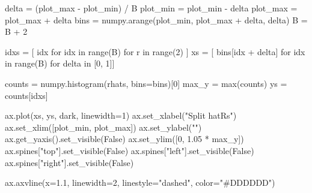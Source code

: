 \documentclass[
  letterpaper,
  DIV=11,
  numbers=noendperiod]{scrartcl}
\newenvironment{Shaded}{\begin{snugshade}}{\end{snugshade}}
\newcommand{\BuiltInTok}[1]{\textcolor[rgb]{0.00,0.23,0.31}{#1}}
\newcommand{\ControlFlowTok}[1]{\textcolor[rgb]{0.00,0.23,0.31}{#1}}
\newcommand{\DecValTok}[1]{\textcolor[rgb]{0.68,0.00,0.00}{#1}}
\newcommand{\FloatTok}[1]{\textcolor[rgb]{0.68,0.00,0.00}{#1}}
\newcommand{\KeywordTok}[1]{\textcolor[rgb]{0.00,0.23,0.31}{#1}}
\newcommand{\NormalTok}[1]{\textcolor[rgb]{0.00,0.23,0.31}{#1}}
\newcommand{\OperatorTok}[1]{\textcolor[rgb]{0.37,0.37,0.37}{#1}}
\newcommand{\StringTok}[1]{\textcolor[rgb]{0.13,0.47,0.30}{#1}}
\newcommand{\VariableTok}[1]{\textcolor[rgb]{0.07,0.07,0.07}{#1}}
\begin{document}
\begin{Shaded}
\begin{Highlighting}[]
\NormalTok{  delta }\OperatorTok{=}\NormalTok{ (plot\_max }\OperatorTok{{-}}\NormalTok{ plot\_min) }\OperatorTok{/}\NormalTok{ B}
\NormalTok{  plot\_min }\OperatorTok{=}\NormalTok{ plot\_min }\OperatorTok{{-}}\NormalTok{ delta}
\NormalTok{  plot\_max }\OperatorTok{=}\NormalTok{ plot\_max }\OperatorTok{+}\NormalTok{ delta}
\NormalTok{  bins }\OperatorTok{=}\NormalTok{ numpy.arange(plot\_min, plot\_max }\OperatorTok{+}\NormalTok{ delta, delta)}
\NormalTok{  B }\OperatorTok{=}\NormalTok{ B }\OperatorTok{+} \DecValTok{2}

\NormalTok{  idxs }\OperatorTok{=}\NormalTok{ [ idx }\ControlFlowTok{for}\NormalTok{ idx }\KeywordTok{in} \BuiltInTok{range}\NormalTok{(B) }\ControlFlowTok{for}\NormalTok{ r }\KeywordTok{in} \BuiltInTok{range}\NormalTok{(}\DecValTok{2}\NormalTok{) ]}
\NormalTok{  xs }\OperatorTok{=}\NormalTok{ [ bins[idx }\OperatorTok{+}\NormalTok{ delta] }\ControlFlowTok{for}\NormalTok{ idx }\KeywordTok{in} \BuiltInTok{range}\NormalTok{(B) }\ControlFlowTok{for}\NormalTok{ delta }\KeywordTok{in}\NormalTok{ [}\DecValTok{0}\NormalTok{, }\DecValTok{1}\NormalTok{]]}

\NormalTok{  counts }\OperatorTok{=}\NormalTok{ numpy.histogram(rhats, bins}\OperatorTok{=}\NormalTok{bins)[}\DecValTok{0}\NormalTok{]}
\NormalTok{  max\_y }\OperatorTok{=} \BuiltInTok{max}\NormalTok{(counts)}
\NormalTok{  ys }\OperatorTok{=}\NormalTok{ counts[idxs]}

\NormalTok{  ax.plot(xs, ys, dark, linewidth}\OperatorTok{=}\DecValTok{1}\NormalTok{)}
\NormalTok{  ax.set\_xlabel(}\StringTok{"Split hatRs"}\NormalTok{)}
\NormalTok{  ax.set\_xlim([plot\_min, plot\_max])}
\NormalTok{  ax.set\_ylabel(}\StringTok{""}\NormalTok{)}
\NormalTok{  ax.get\_yaxis().set\_visible(}\VariableTok{False}\NormalTok{)}
\NormalTok{  ax.set\_ylim([}\DecValTok{0}\NormalTok{, }\FloatTok{1.05} \OperatorTok{*}\NormalTok{ max\_y])}
\NormalTok{  ax.spines[}\StringTok{"top"}\NormalTok{].set\_visible(}\VariableTok{False}\NormalTok{)}
\NormalTok{  ax.spines[}\StringTok{"left"}\NormalTok{].set\_visible(}\VariableTok{False}\NormalTok{)}
\NormalTok{  ax.spines[}\StringTok{"right"}\NormalTok{].set\_visible(}\VariableTok{False}\NormalTok{)}

\NormalTok{  ax.axvline(x}\OperatorTok{=}\FloatTok{1.1}\NormalTok{, linewidth}\OperatorTok{=}\DecValTok{2}\NormalTok{, linestyle}\OperatorTok{=}\StringTok{"dashed"}\NormalTok{, color}\OperatorTok{=}\StringTok{"\#DDDDDD"}\NormalTok{)}

\end{Highlighting}
\end{Shaded}
\end{document}
